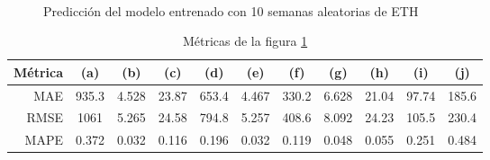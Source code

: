 \documentclass[a4paper,10pt]{article}
\begin{document}
\begin{figure}[h]
    \\
  \caption{Predicción del modelo entrenado con 10 semanas aleatorias de ETH}
  \label{f:eth_wk_arima}
\end{figure}

\begin{table}[h]
 \begin{center}
  \begin{tabular}{|r|c|c|c|c|c|c|c|c|c|c|}
    Métrica & (a) & (b) & (c) & (d) & (e) & (f) & (g) & (h) & (i) & (j) \\ \hline
    MAE & 935.3 & 4.528 & 23.87 & 653.4 & 4.467 & 330.2 & 6.628 & 21.04 & 97.74 & 185.6 \\
    RMSE & 1061 & 5.265 & 24.58 & 794.8 & 5.257 & 408.6 & 8.092 & 24.23 & 105.5 & 230.4 \\
    MAPE & 0.372 & 0.032 & 0.116 & 0.196 & 0.032 & 0.119 & 0.048 & 0.055 & 0.251 & 0.484 \\ \hline
  \end{tabular}
  \caption{Métricas de la figura \ref{f:eth_wk_arima}}
  \label{tab:eth}
 \end{center}
\end{table}
\end{document}
